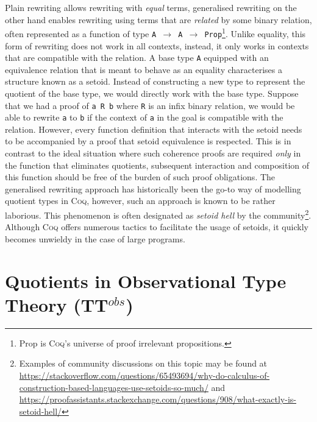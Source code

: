 \documentclass[12pt,twoside,maitrise]{dms}
\theoremstyle{definition}
\numberwithin{equation}{section}
\numberwithin{table}{chapter}
\numberwithin{figure}{chapter}
\newcommand\kw[1] {\textsf{#1}}
\newcommand\id[1] {\texttt{#1}}
\newcommand\fn[1] {\texttt{#1}}
\def\Coq{\textsc{Coq}\xspace}
\begin{document}
Plain rewriting allows rewriting with \emph{equal} terms, generalised
rewriting\cite{sozeau2009new, coq-gen-rewriting} on the other hand enables
rewriting using terms that are \emph{related} by some binary relation, often
represented as a function of type \fn{A $\rightarrow$ A $\rightarrow$
  \kw{Prop}}\footnote{\kw{Prop} is \Coq{}'s universe of proof irrelevant
propositions.}. Unlike equality, this form of rewriting does not work in all
contexts, instead, it only works in contexts that are compatible with the
relation. A base type \id{A} equipped with an equivalence relation that is meant
to behave as an equality characterises a structure known as a
setoid\cite{hofmann1995simple}. Instead of constructing a new type to represent
the quotient of the base type, we would directly work with the base type.
Suppose that we had a proof of \fn{a R b} where \id{R} is an infix binary
relation, we would be able to rewrite \id{a} to \id{b} if the context of \id{a}
in the goal is compatible with the relation. However, every function definition
that interacts with the setoid needs to be accompanied by a proof that setoid
equivalence is respected. This is in contrast to the ideal situation where such
coherence proofs are required \emph{only} in the function that eliminates
quotients, subsequent interaction and composition of this function should be
free of the burden of such proof obligations. The generalised rewriting approach
has historically been the go-to way of modelling quotient types in \Coq{},
however, such an approach is known to be rather laborious. This phenomenon is
often designated as \emph{setoid hell} by the community\footnote{Examples of
community discussions on this topic may be found at
\url{https://stackoverflow.com/questions/65493694/why-do-calculus-of-construction-based-languages-use-setoids-so-much/}
and
\url{https://proofassistants.stackexchange.com/questions/908/what-exactly-is-setoid-hell/}}.
Although \Coq{} offers numerous tactics to facilitate the usage of setoids, it
quickly becomes unwieldy in the case of large programs.

\section{Quotients in Observational Type Theory (TT$^{obs}$)}

\end{document}
